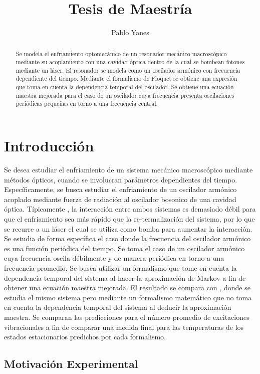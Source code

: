 \documentclass[a4paper,10pt]{report}
\title{Tesis de Maestría}
\author{Pablo Yanes}
\begin{document}
\begin{abstract}
Se modela el enfriamiento optomecánico de un resonador mecánico macroscópico mediante su acoplamiento con una cavidad óptica dentro de la cual se bombean fotones mediante un láser. El resonador se modela como un oscilador armónico con frecuencia dependiente del tiempo. Mediante el formalismo de Floquet se obtiene una expresión que toma en cuenta la dependencia temporal del oscilador. Se obtiene una ecuación maestra mejorada para el caso de un oscilador cuya frecuencia presenta oscilaciones periódicas pequeñas en torno a una frecuencia central. 
\end{abstract}

\tableofcontents

\chapter{Introducción}

Se desea estudiar el enfriamiento de un sistema mecánico macroscópico mediante métodos ópticos, cuando se involucran parámetros dependientes del tiempo. Específicamente, se busca estudiar el enfriamiento de un oscilador armónico acoplado mediante fuerza de radiación al oscilador bosonico de una cavidad óptica. Típicamente \cite{BarberisLC}, la interacción entre ambos sistemas es demasiado débil para que el enfriamiento sea más rápido que la re-termalización del sistema, por lo que se recurre a un láser el cual se utiliza como bomba para aumentar la interacción. Se estudia de forma específica el caso donde la frecuencia del oscilador armónico es una función periódica del tiempo. Se toma el caso de un oscilador armónico cuya frecuencia oscila débilmente y de manera periódica en torno a una frecuencia promedio. Se busca utilizar un formalismo que tome en cuenta la dependencia temporal del sistema al hacer la aproximación de Markov a fin de obtener una ecuación maestra mejorada. El resultado se compara con \cite{BarberisLC}, donde se estudia el mismo sistema pero mediante un formalismo matemático que no toma en cuenta la dependencia temporal del sistema al deducir la aproximación maestra. Se comparan las predicciones para el número promedio de excitaciones vibracionales a fin de comparar una medida final para las temperaturas de los estados estacionarios predichos por cada formalismo.

\section{Motivación Experimental}
\end{document}
